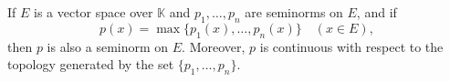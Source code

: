 If $E$ is a vector space over $\mathbb{K}$ and $p_1, \ldots, p_n$ are seminorms on $E$, and if
$$p(x) = \max \{p_1(x), \ldots, p_n(x)\} \quad (x \in E),$$
then $p$ is also a seminorm on $E$. Moreover, $p$ is continuous with respect to the topology generated by the set $\{p_1, \ldots, p_n\}$.
